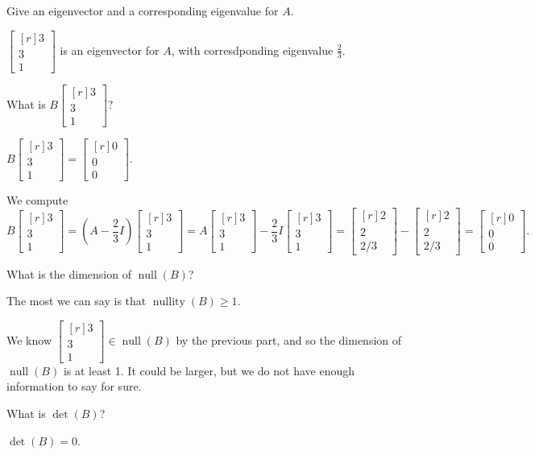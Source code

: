 \documentclass{problemset}
\DeclareMathOperator{\Null}{null}
\DeclareMathOperator{\Nullity}{nullity}
\newcommand{\mat}[1]{\begin{bmatrix*}[r]#1\end{bmatrix*}}
\begin{document}
	\begin{parts}
		\item Give an eigenvector and a corresponding eigenvalue for $A$.
			\begin{solution}
				$\mat{3\\3\\1}$ is an eigenvector for $A$, with corresdponding
				eigenvalue $\frac{2}{3}$.
			\end{solution}
		\item What is $B\mat{3\\3\\1}$?
			\begin{solution}
				$B\mat{3\\3\\1}=\mat{0\\0\\0}$.

				We compute
				\[
					B\mat{3\\3\\1}
					=(A-\frac{2}{3}I)\mat{3\\3\\1}
					=A\mat{3\\3\\1} - \frac{2}{3}I\mat{3\\3\\1}
					=\mat{2\\2\\2/3} - \mat{2\\2\\2/3}
					=\mat{0\\0\\0}.
				\]
			\end{solution}
		\item What is the dimension of $\Null(B)$?
			\begin{solution}
				The most we can say is that $\Nullity(B)\geq1$.

				We know $\mat{3\\3\\1}\in\Null(B)$ by the previous part, and so
				the dimension of $\Null(B)$ is at least 1. It could be larger, but
				we do not have enough information to say for sure.
			\end{solution}
		\item What is $\det(B)$?
			\begin{solution}[inline]
				$\det(B)=0$.
			\end{solution}
	\end{parts}
\end{document}
